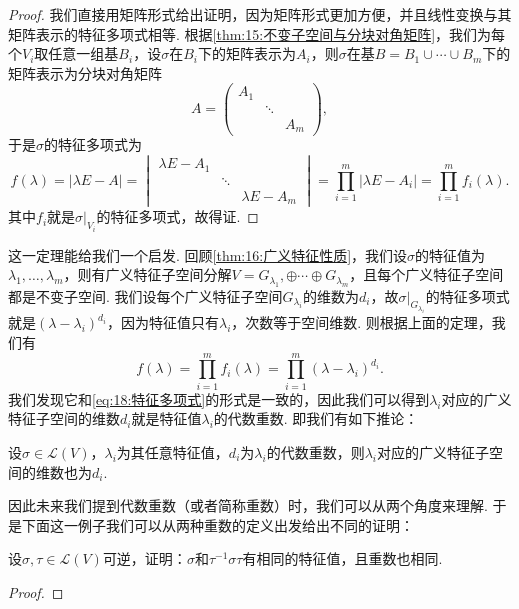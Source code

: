 \begin{proof}
    我们直接用矩阵形式给出证明，因为矩阵形式更加方便，并且线性变换与其矩阵表示的特征多项式相等. 根据\autoref{thm:15:不变子空间与分块对角矩阵}，我们为每个$V_i$取任意一组基$B_i$，设$\sigma$在$B_i$下的矩阵表示为$A_i$，则$\sigma$在基$B=B_1\cup\cdots\cup B_m$下的矩阵表示为分块对角矩阵
    \[A=\begin{pmatrix}
            A_1 & & \\
             & \ddots & \\
             & & A_m
        \end{pmatrix},\]
    于是$\sigma$的特征多项式为
    \[f(\lambda)=|\lambda E-A|=\begin{vmatrix}
            \lambda E-A_1 & & \\
             & \ddots & \\
             & & \lambda E-A_m
        \end{vmatrix}=\prod_{i=1}^m|\lambda E-A_i|=\prod_{i=1}^m f_i(\lambda).\]
    其中$f_i$就是$\sigma\vert_{V_i}$的特征多项式，故得证.
\end{proof}

这一定理能给我们一个启发. 回顾\autoref{thm:16:广义特征性质}，我们设$\sigma$的特征值为$\lambda_1,\ldots,\lambda_m$，则有广义特征子空间分解$V=G_{\lambda_1},\oplus\cdots\oplus G_{\lambda_m}$，且每个广义特征子空间都是不变子空间. 我们设每个广义特征子空间$G_{\lambda_i}$的维数为$d_i$，故$\sigma\vert_{G_{\lambda_i}}$的特征多项式就是$(\lambda-\lambda_i)^{d_i}$，因为特征值只有$\lambda_i$，次数等于空间维数. 则根据上面的定理，我们有
\[f(\lambda)=\prod_{i=1}^m f_i(\lambda)=\prod_{i=1}^m (\lambda-\lambda_i)^{d_i}.\]
我们发现它和\autoref{eq:18:特征多项式}的形式是一致的，因此我们可以得到$\lambda_i$对应的广义特征子空间的维数$d_i$就是特征值$\lambda_i$的代数重数. 即我们有如下推论：
\begin{corollary}
    设$\sigma\in \mathcal{L}(V)$，$\lambda_i$为其任意特征值，$d_i$为$\lambda_i$的代数重数，则$\lambda_i$对应的广义特征子空间的维数也为$d_i$.
\end{corollary}

因此未来我们提到代数重数（或者简称重数）时，我们可以从两个角度来理解. 于是下面这一例子我们可以从两种重数的定义出发给出不同的证明：
\begin{example}
    设$\sigma,\tau\in \mathcal{L}(V)$可逆，证明：$\sigma$和$\tau^{-1}\sigma\tau$有相同的特征值，且重数也相同.
\end{example}

\begin{proof}

\end{proof}

